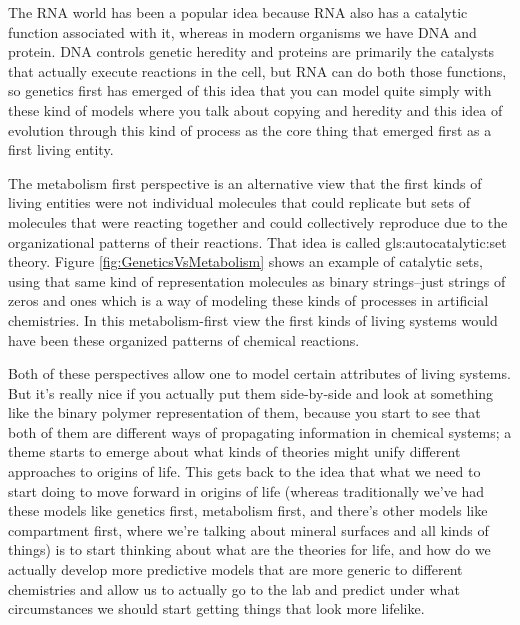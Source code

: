 \documentclass[]{article}
\begin{document}
The RNA world
has been a popular idea because
RNA also has a catalytic function
associated with it, whereas in modern
organisms we have DNA and protein.
DNA controls genetic heredity and
proteins are primarily the catalysts
that actually execute reactions in the
cell, but RNA can do both those functions, so
genetics first has emerged of this idea
that you can model quite simply with
these kind of models where you talk
about copying and heredity and this idea
of evolution through this kind of
process as the core thing that emerged
first as a first living entity.

The metabolism first perspective is an
alternative view that the first kinds of
living entities were not individual
molecules that could replicate but sets
of molecules that were reacting together
and could collectively reproduce due to
the organizational patterns of their
reactions. That idea is called
\gls{gls:autocatalytic:set} theory.
  Figure \ref{fig:GeneticsVsMetabolism} shows
an example of catalytic
sets, using that same kind of
representation  molecules
as binary strings--just strings of zeros
and ones which is a way of modeling
these kinds of processes in artificial
chemistries. In this metabolism-first view the first kinds of living
systems would have been these organized
patterns of chemical reactions.

Both of these perspectives allow one to
model certain attributes of living
systems. But it's really nice if you
actually put them side-by-side and look
at something like the binary polymer
representation of them, because you start
to see that both of them are different
ways of propagating information in
chemical systems; a theme starts to
emerge about what kinds of theories
might unify different approaches to
origins of life. This gets back to
the idea that what we need to start
doing to move forward in origins of life
(whereas traditionally we've had these
models like genetics first, metabolism
first, and there's other models like
compartment first, where
we're talking about
mineral surfaces and all kinds of
things) is to start
thinking about what are the theories for
life, and how do we actually develop more
predictive models that are more generic
to different chemistries and allow us
to actually go to the lab and predict
under what circumstances we should start
getting things that look more lifelike.
\end{document}
